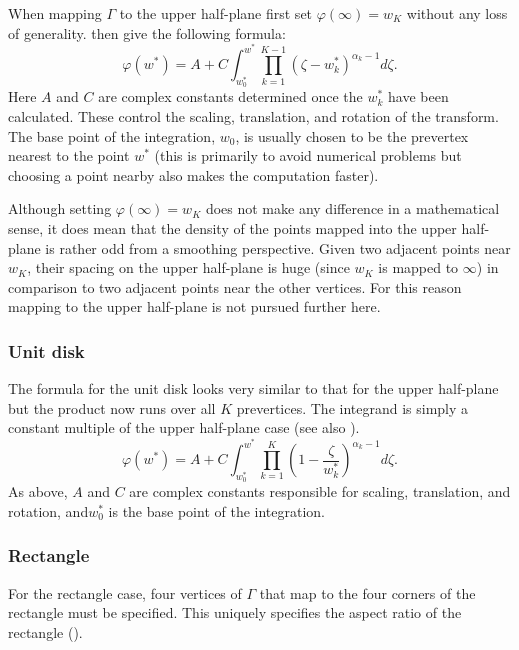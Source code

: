 When mapping $\Gamma$ to the upper half-plane first set $\varphi(\infty) = w_K$ without any loss of generality.  then give the following formula:
\begin{equation}
\varphi(w^*) = A + C \int^{w^*}_{w^*_0} \prod_{k=1}^{K-1} \left (\zeta-w^*_k \right )^{\alpha_k-1} d\zeta.
\end{equation}
Here $A$ and $C$ are complex constants determined once the $w^*_k$ have been calculated. These control the scaling, translation, and rotation of the transform. The base point of the integration, $w_0$, is usually chosen to be the prevertex nearest to the point $w^*$ (this is primarily to avoid numerical problems but choosing a point nearby also makes the computation faster).

Although setting $\varphi(\infty) = w_K$ does not make any difference in a mathematical sense, it does mean that the density of the points mapped into the upper half-plane is rather odd from a smoothing perspective. Given two adjacent points near $w_K$, their spacing on the upper half-plane is huge (since $w_K$ is mapped to $\infty$) in comparison to two adjacent points near the other vertices. For this reason mapping to the upper half-plane is not pursued further here.

\subsubsection{Unit disk}

The formula for the unit disk looks very similar to that for the upper half-plane but the product now runs over all $K$ prevertices. The integrand is simply a constant multiple of the upper half-plane case (see also \cite[p. 12]{driscoll}).
\begin{equation}
\label{unitscmap}
\varphi(w^*) = A + C \int^{w^*}_{w^*_0} \prod_{k=1}^{K} \left (1 - \frac{\zeta}{w^*_k} \right )^{\alpha_k-1} d\zeta.
\end{equation}
As above, $A$ and $C$ are complex constants responsible for scaling, translation, and rotation, and$w^*_0$ is the base point of the integration.

\subsubsection{Rectangle}

For the rectangle case, four vertices of $\Gamma$ that map to the four corners of the rectangle must be specified. This uniquely specifies the aspect ratio of the rectangle (\cite[p. 48]{driscoll}).

